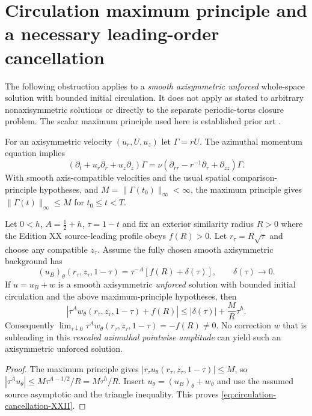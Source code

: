 
\section{Circulation maximum principle and a necessary leading-order cancellation}
\label{sec:circulation-max-gate}
The following obstruction applies to a \emph{smooth axisymmetric unforced}
whole-space solution with bounded initial circulation. It does not apply
as stated to arbitrary nonaxisymmetric solutions or directly to the
separate periodic-torus closure problem. The scalar maximum principle
used here is established prior art \cite{circulationMP2023}.

For an axisymmetric velocity $(u_r,U,u_z)$ let $\Gamma=rU$. The
azimuthal momentum equation implies
\begin{equation}\label{eq:Gamma-axis-XXII}
 (\partial_t+u_r\partial_r+u_z\partial_z)\Gamma
 =\nu(\partial_{rr}-r^{-1}\partial_r+\partial_{zz})\Gamma.
\end{equation}
With smooth axis-compatible velocities and the usual spatial
comparison-principle hypotheses, and $M=\|\Gamma(t_0)\|_\infty<\infty$,
the maximum principle gives
$\|\Gamma(t)\|_\infty\le M$ for $t_0\le t<T$.

\begin{theorem}
\label{thm:circulation-cancel-XXII}
Let $0<h$, $A=\frac12+h$, $\tau=1-t$ and fix an exterior similarity
radius $R>0$ where the Edition XX source-leading profile obeys $f(R)>0$.
Let $r_\tau=R\sqrt{\tau}$ and choose any compatible $z_\tau$.
Assume the fully chosen smooth axisymmetric background has
\[
 (u_B)_\theta(r_\tau,z_\tau,1-\tau)
 =\tau^{-A}[f(R)+\delta(\tau)],\qquad \delta(\tau)\longrightarrow0.
\]
If $u=u_B+w$ is a smooth axisymmetric \emph{unforced} solution with
bounded initial circulation and the above maximum-principle hypotheses,
then
\begin{equation}\label{eq:circulation-cancellation-XXII}
 \left|\tau^A w_\theta(r_\tau,z_\tau,1-\tau)+f(R)\right|
 \le |\delta(\tau)|+\frac{M}{R}\tau^h.
\end{equation}
Consequently
$\lim_{\tau\downarrow0}\tau^A w_\theta(r_\tau,z_\tau,1-\tau)
=-f(R)\ne0$.
No correction $w$ that is subleading in this \emph{rescaled azimuthal
pointwise amplitude} can yield such an axisymmetric unforced solution.
\end{theorem}
\begin{proof}
The maximum principle gives
$|r_\tau u_\theta(r_\tau,z_\tau,1-\tau)|\le M$,
so $|\tau^A u_\theta|\le M\tau^{A-1/2}/R=M\tau^h/R$.
Insert $u_\theta=(u_B)_\theta+w_\theta$ and use the assumed source
asymptotic and the triangle inequality. This proves
\eqref{eq:circulation-cancellation-XXII}.
\end{proof}

